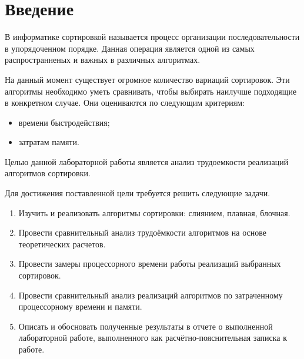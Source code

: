 
\chapter*{Введение}
В информатике сортировкой называется процесс организации последовательности в упорядоченном порядке.
Данная операция является одной из самых распространненых и важных в различных алгоритмах.  

На данный момент существует огромное количество вариаций сортировок.
Эти алгоритмы необходимо уметь сравнивать, чтобы выбирать наилучше подходящие в конкретном случае. 
Они оцениваются по следующим критериям:

\begin{itemize}
	\item времени быстродействия;
	\item затратам памяти.
\end{itemize}

Целью данной лабораторной работы является анализ трудоемкости реализаций алгоритмов сортировки.

Для достижения поставленной цели требуется решить следующие задачи.
\begin{enumerate}
	\item Изучить и реализовать алгоритмы сортировки: слиянием, плавная, блочная.
	\item Провести сравнительный анализ трудоёмкости алгоритмов на основе теоретических расчетов.
	\item Провести замеры процессорного времени работы реализаций выбранных сортировок.
	\item Провести сравнительный анализ реализаций алгоритмов по затраченному процессорному времени и памяти.
	\item Описать и обосновать полученные результаты в отчете о выполненной лабораторной работе, выполненного как расчётно-пояснительная записка к работе.
\end{enumerate}

\newpage
